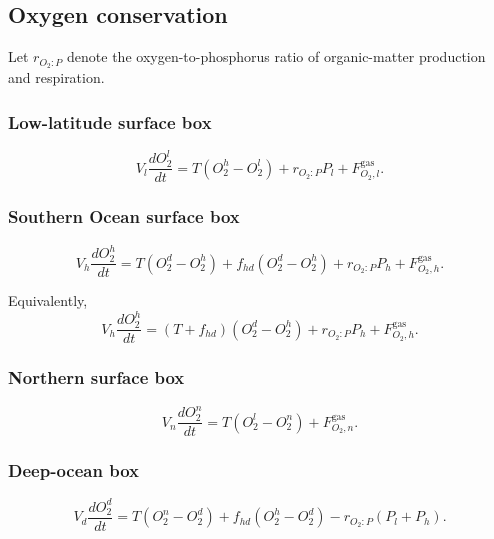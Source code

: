 \documentclass[11pt]{article}
\begin{document}
\subsection{Oxygen conservation}

Let \(r_{O_2:P}\) denote the oxygen-to-phosphorus ratio of
organic-matter production and respiration.

\subsubsection{Low-latitude surface box}

\begin{equation}
V_l\frac{dO_2^l}{dt}
=
T\left(O_2^h-O_2^l\right)
+
r_{O_2:P}P_l
+
F^{\mathrm{gas}}_{O_2,l}.
\label{eq:four_o2_l}
\end{equation}

\subsubsection{Southern Ocean surface box}

\begin{equation}
V_h\frac{dO_2^h}{dt}
=
T\left(O_2^d-O_2^h\right)
+
f_{hd}\left(O_2^d-O_2^h\right)
+
r_{O_2:P}P_h
+
F^{\mathrm{gas}}_{O_2,h}.
\label{eq:four_o2_h}
\end{equation}

Equivalently,
\begin{equation}
V_h\frac{dO_2^h}{dt}
=
\left(T+f_{hd}\right)
\left(O_2^d-O_2^h\right)
+
r_{O_2:P}P_h
+
F^{\mathrm{gas}}_{O_2,h}.
\end{equation}

\subsubsection{Northern surface box}

\begin{equation}
V_n\frac{dO_2^n}{dt}
=
T\left(O_2^l-O_2^n\right)
+
F^{\mathrm{gas}}_{O_2,n}.
\label{eq:four_o2_n}
\end{equation}

\subsubsection{Deep-ocean box}

\begin{equation}
V_d\frac{dO_2^d}{dt}
=
T\left(O_2^n-O_2^d\right)
+
f_{hd}\left(O_2^h-O_2^d\right)
-
r_{O_2:P}\left(P_l+P_h\right).
\label{eq:four_o2_d}
\end{equation}
\end{document}
